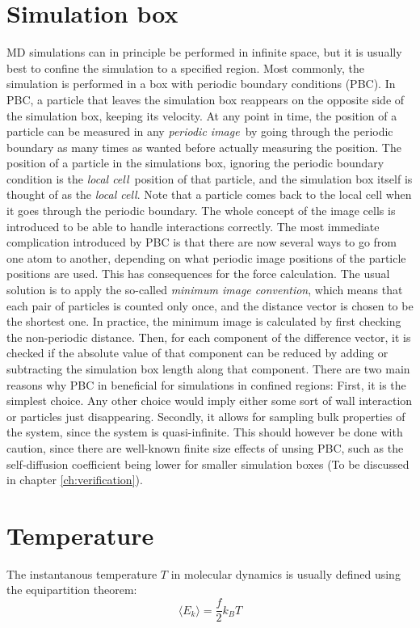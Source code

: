 \section{Simulation box}
MD simulations can in principle be performed in infinite space, but it is usually best to confine the simulation to a specified region. Most commonly, the simulation is performed in a box with periodic boundary conditions (PBC). In PBC, a particle that leaves the simulation box reappears on the opposite side of the simulation box, keeping its velocity. At any point in time, the position of a particle can be measured in any \emph{periodic image} by going through the periodic boundary as many times as wanted before actually measuring the position. The position of a particle in the simulations box, ignoring the periodic boundary condition is the \emph{local cell} position of that particle, and the simulation box itself is thought of as the \emph{local cell}. Note that a particle comes back to the local cell when it goes through the periodic boundary. The whole concept of the image cells is introduced to be able to handle interactions correctly. The most immediate complication introduced by PBC is that there are now several ways to go from one atom to another, depending on what periodic image positions of the particle positions are used. This has consequences for the force calculation. The usual solution is to apply the so-called \emph{minimum image convention}, which means that each pair of particles is counted only once, and the distance vector is chosen to be the shortest one. In practice, the minimum image is calculated by first checking the non-periodic distance. Then, for each component of the difference vector, it is checked if the absolute value of that component can be reduced by adding or subtracting the simulation box length along that component.
There are two main reasons why PBC in beneficial for simulations in confined regions: First, it is the simplest choice. Any other choice would imply either some sort of wall interaction or particles just disappearing. Secondly, it allows for sampling bulk properties of the system, since the system is quasi-infinite. This should however be done with caution, since there are well-known finite size effects of unsing PBC, such as the self-diffusion coefficient being lower for smaller simulation boxes (To be discussed in chapter \ref{ch:verification}).

\section{Temperature}
The instantanous temperature $T$ in molecular dynamics is usually defined using the equipartition theorem:
\begin{equation}
	\langle E_k \rangle = \frac{f}{2}k_B T
\end{equation}

